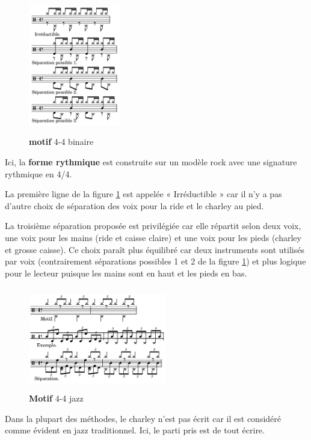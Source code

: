 \label{sys_sep_voix}
\begin{figure}[h]
	\centering
	\includegraphics[height=60mm, width=40mm]{
    z_images/3_methodes/2_systemes/1_separation_4-4_binaire.png}
	\caption{\textbf{motif} 4-4 binaire}
	\label{binaire}
\end{figure}


Ici, la \textbf{forme rythmique} est construite sur un modèle rock avec une
signature rythmique en 4/4.

La première ligne de la figure \ref{binaire} est
appelée « Irréductible » car il n’y a pas d’autre choix de séparation des voix
pour la ride et le charley au pied.

La troisième séparation proposée est privilégiée car elle répartit selon deux 
voix, une voix pour les mains (ride et caisse claire) et une voix pour les
pieds (charley et grosse caisse). Ce choix paraît plus équilibré car deux
instruments sont utilisés par voix (contrairement séparations possibles 1 et 2
de la figure \ref{binaire}) et plus logique pour le lecteur puisque les mains
sont en haut et les pieds en bas.

\begin{figure}[h]
\centering
\includegraphics[height=45mm, width=60mm]{
z_images/3_methodes/2_systemes/2_separation_4-4_jazz.png}
\caption{\textbf{Motif} 4-4 jazz}
\label{jazz}
\end{figure}
\newpage
Dans la plupart des méthodes, le charley n’est pas écrit car il est considéré
comme évident en jazz traditionnel. Ici, le parti pris est de tout écrire.

